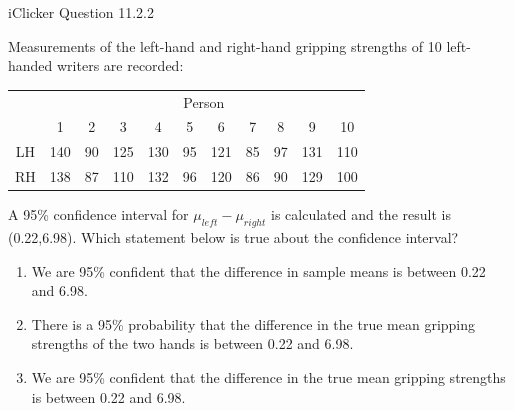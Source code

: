\documentclass[14pt]{beamer}\usepackage[]{graphicx}\usepackage[]{color}
\begin{document}
\begin{frame}[fragile]{iClicker Question 11.2.2}

{\scriptsize{
Measurements of the left-hand and right-hand gripping strengths of 10  left-handed writers are recorded:
}}

\begin{table}[ht]
\centering
{\footnotesize{
\begin{tabular}{@{} ccccccccccc @{}} \hline
  & \multicolumn{10}{c}{Person} \\
  & 1 & 2 & 3 & 4 & 5 & 6 & 7 & 8 & 9 & 10 \\ \hline
LH & 140&90&125&130&95&121&85&97&131&110 \\
RH & 138&87&110&132&96&120&86&90&129&100 \\ \hline
\end{tabular}
}}
\end{table}

{\footnotesize{
A 95\% confidence interval for $\mu_{left} - \mu_{right}$ is calculated and the result is  (0.22,6.98). Which statement below is true about the confidence interval?

\vspace{-3mm}

\begin{enumerate}
\item We are 95\% confident that the difference in sample means is  between 0.22 and 6.98.
\item There is a 95\% probability that the difference in the true mean  gripping strengths of the two hands is between 0.22 and 6.98.
\item We are 95\% confident that the difference in the true mean  gripping strengths is between 0.22 and 6.98.
\end{enumerate}
}}
\end{frame}
\end{document}
